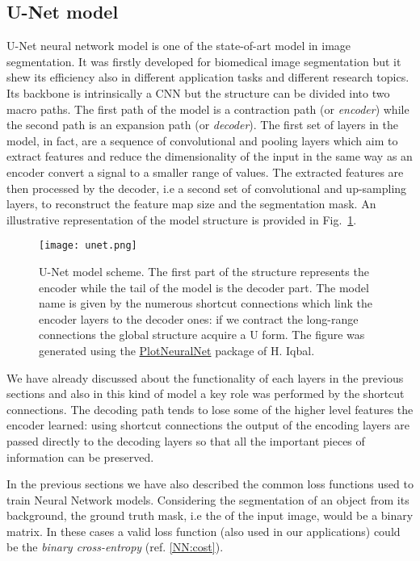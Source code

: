 \documentclass{standalone}
\begin{document}
\subsection[U-Net model]{U-Net model}\label{segmentation:Unet}

U-Net neural network model is one of the state-of-art model in image segmentation.
It was firstly developed for biomedical image segmentation but it shew its efficiency also in different application tasks and different research topics.
Its backbone is intrinsically a  CNN but the structure can be divided into two macro paths.
The first path of the model is a contraction path (or \emph{encoder}) while the second path is an expansion path (or \emph{decoder}).
The first set of layers in the model, in fact, are a sequence of convolutional and pooling layers which aim to extract features and reduce the dimensionality of the input in the same way as an encoder convert a signal to a smaller range of values.
The extracted features are then processed by the decoder, i.e a second set of convolutional and up-sampling layers, to reconstruct the feature map size and the segmentation mask.
An illustrative representation of the model structure is provided in Fig.~\ref{fig:unet}.

\begin{center}
\begin{figure}[htbp]
\centering
\texttt{[image: unet.png]}
\caption{U-Net model scheme.
The first part of the structure represents the encoder while the tail of the model is the decoder part.
The model name is given by the numerous shortcut connections which link the encoder layers to the decoder ones: if we contract the long-range connections the global structure acquire a U form.
The figure was generated using the \href{https://github.com/HarisIqbal88/PlotNeuralNet}{PlotNeuralNet} package of H. Iqbal.
}
\label{fig:unet}
\end{figure}
\end{center}

We have already discussed about the functionality of each layers in the previous sections and also in this kind of model a key role was performed by the shortcut connections.
The decoding path tends to lose some of the higher level features the encoder learned: using shortcut connections the output of the encoding layers are passed directly to the decoding layers so that all the important pieces of information can be preserved.

In the previous sections we have also described the common loss functions used to train Neural Network models.
Considering the  segmentation of an object from its background, the ground truth mask, i.e the  of the input image, would be a binary matrix.
In these cases a valid loss function (also used in our applications) could be the \emph{binary cross-entropy} (ref. \ref{NN:cost}).
\end{document}
